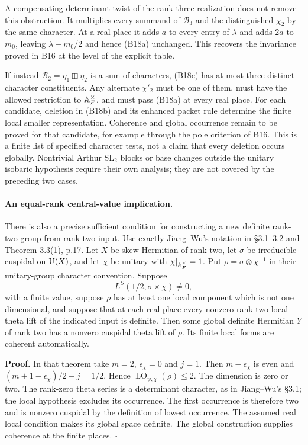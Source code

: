 \documentclass[11pt]{article}
\theoremstyle{definition}\newtheorem{definition}[theorem]{Definition}\newtheorem{remark}[theorem]{Remark}
\begin{document}
A compensating determinant twist of the rank-three realization
does not remove this obstruction. It multiplies every summand
of $\mathcal B_3$ and the distinguished $\chi_2$ by the same
character. At a real place it adds $a$ to every entry of
$\lambda$ and adds $2a$ to $m_0$, leaving
$\lambda-m_0/2$ and hence (B18a) unchanged. This recovers the
invariance proved in B16 at the level of the explicit table.

If instead $\mathcal B_2=\eta_1\boxplus\eta_2$ is a sum of
characters, (B18c) has at most three distinct character
constituents. Any alternate $\chi'_2$ must be one of them,
must have the allowed restriction to $\mathbb A_F^\times$, and must
pass (B18a) at every real place. For each candidate, deletion
in (B18b) and its enhanced packet rule determine the finite
local smaller representation. Coherence and global occurrence
remain to be proved for that candidate, for example through
the pole criterion of B16. This is a finite list of specified
character tests, not a claim that every deletion occurs globally.
Nontrivial Arthur $\mathrm{SL}_2$ blocks or base changes outside
the unitary isobaric hypothesis require their own analysis;
they are not covered by the preceding two cases.

\paragraph{An equal-rank central-value implication.}
There is also a precise sufficient condition for constructing a
new definite rank-two group from rank-two input. Use exactly
Jiang--Wu's notation in \S3.1--3.2 and Theorem 3.3(1), p.17.
Let $X$ be skew-Hermitian of rank two, let $\sigma$ be irreducible
cuspidal on $\operatorname{U}(X)$, and let $\chi$ be unitary with
$\chi|_{\mathbb A_F^\times}=1$.
Put $\rho=\sigma\otimes\chi^{-1}$ in their unitary-group
character convention. Suppose
\[
 L^S(1/2,\sigma\times\chi)\ne0,
 \tag{B18d}
\]
with a finite value, suppose $\rho$ has at least one local
component which is not one dimensional, and suppose that
at each real place every nonzero rank-two local theta lift
of the indicated input is definite. Then some global definite
Hermitian $Y$ of rank two has a nonzero cuspidal theta lift of
$\rho$. Its finite local forms are coherent automatically.

\textbf{Proof.}
In that theorem take $m=2$, $\epsilon_\chi=0$ and $j=1$.
Then $m-\epsilon_\chi$ is even and
$(m+1-\epsilon_\chi)/2-j=1/2$. Hence
$\operatorname{LO}_{\psi,\chi}(\rho)\leq2$.
The dimension is zero or two. The rank-zero theta series is
a determinant character, as in Jiang--Wu's \S3.1; the local
hypothesis excludes its occurrence. The first occurrence is
therefore two and is nonzero cuspidal by the definition of
lowest occurrence. The assumed real local condition makes its
global space definite. The global construction supplies
coherence at the finite places. \hfill$\square$
\end{document}
